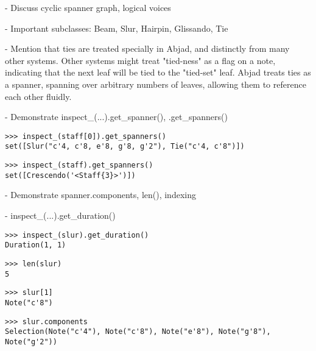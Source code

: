 -   Discuss cyclic spanner graph, logical voices

-   Important subclasses: Beam, Slur, Hairpin, Glissando, Tie

-   Mention that ties are treated specially in Abjad, and distinctly from many
    other systems. Other systems might treat "tied-ness" as a flag on a note,
    indicating that the next leaf will be tied to the "tied-set" leaf. Abjad
    treats ties as a spanner, spanning over arbitrary numbers of leaves,
    allowing them to reference each other fluidly.

-   Demonstrate inspect\_(...).get\_spanner(), .get\_spanners()

\begin{comment}
<abjad>
inspect_(staff[0]).get_spanners()
inspect_(staff).get_spanners()
</abjad>
\end{comment}

\begin{abjadbookoutput}
\begin{singlespacing}
\vspace{-0.5\baselineskip}
\begin{lstlisting}
>>> inspect_(staff[0]).get_spanners()
set([Slur("c'4, c'8, e'8, g'8, g'2"), Tie("c'4, c'8")])
\end{lstlisting}
\begin{lstlisting}
>>> inspect_(staff).get_spanners()
set([Crescendo('<Staff{3}>')])
\end{lstlisting}
\end{singlespacing}
\end{abjadbookoutput}

-   Demonstrate spanner.components, len(), indexing

-   inspect\_(...).get\_duration()

\begin{comment}
<abjad>
inspect_(slur).get_duration()
len(slur)
slur[1]
slur.components
</abjad>
\end{comment}

\begin{abjadbookoutput}
\begin{singlespacing}
\vspace{-0.5\baselineskip}
\begin{lstlisting}
>>> inspect_(slur).get_duration()
Duration(1, 1)
\end{lstlisting}
\begin{lstlisting}
>>> len(slur)
5
\end{lstlisting}
\begin{lstlisting}
>>> slur[1]
Note("c'8")
\end{lstlisting}
\begin{lstlisting}
>>> slur.components
Selection(Note("c'4"), Note("c'8"), Note("e'8"), Note("g'8"), Note("g'2"))
\end{lstlisting}
\end{singlespacing}
\end{abjadbookoutput}

